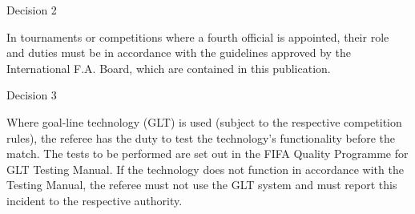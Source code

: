 \bigskip

Decision 2

In tournaments or competitions where a fourth official is appointed, their role and duties must be in accordance with the guidelines approved by the International F.A. Board, which are contained in this publication.

\bigskip

Decision 3

Where goal-line technology (GLT) is used (subject to the respective competition rules), the referee has the duty to test the technology's functionality before the match. The tests to be performed are set out in the FIFA Quality Programme for GLT Testing Manual. If the technology does not function in accordance with the Testing Manual, the referee must not use the GLT system and must report this incident to the respective authority. 
